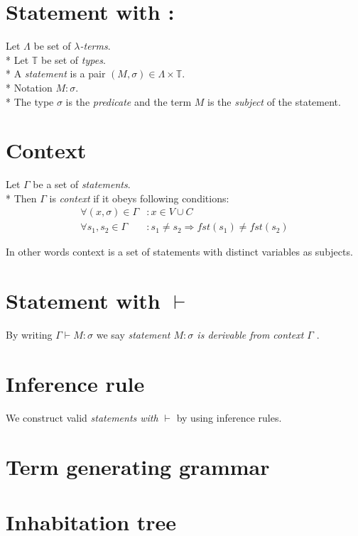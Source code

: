 \documentclass[12pt]{report}
\begin{document}
	\section{Statement with :}
	Let $\Lambda$ be set of {\it $\lambda$-terms}. \\*
	Let $\mathbb{T}$ be set of {\it types}.       \\*
	A {\it statement} is a pair $(M,\sigma) \in \Lambda \times \mathbb{T}$. \\*
	Notation $M : \sigma$. \\* 
	The type $\sigma$ is the {\it predicate} and the term $M$ is the
	{\it subject} of the statement.  
	
	\section{Context}
	Let $\Gamma$ be a set of {\it statements}.	\\*
	Then $\Gamma$ is {\it context} if it obeys following conditions:
	\begin{align*}
		 \forall (x,\sigma) \in \Gamma &: x \in V \cup C \\
		 \forall s_1,s_2 \in \Gamma &: s_1 \neq s_2 \Rightarrow fst(s_1) \neq fst(s_2)
    \end{align*}
    
	In other words context is a set of statements with distinct variables as subjects.
	
	
	\section{Statement with $\vdash$}
	By writing $ \Gamma \vdash M : \sigma$ we say 
	{\it statement $M : \sigma$ is derivable from context $\Gamma$ }.
	
		
	\section{Inference rule}	
	We construct valid {\it statements with $\vdash$} by using inference rules.
	
	
		
	
	\section{Term generating grammar}

	\section{Inhabitation tree}
\end{document}

